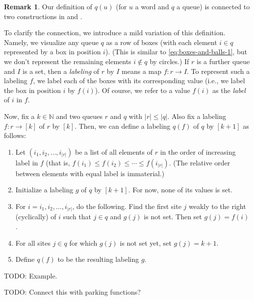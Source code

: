 \documentclass[reqno]{amsart}
\newcommand{\0}{\phantom{c}}
\newcommand{\NN}{\mathbb{N}}
\newcommand{\abs}[1]{\left| #1 \right|}
\newcommand{\tup}[1]{\left( #1 \right)}
\newcommand{\ive}[1]{\left[ #1 \right]}
\newcommand{\defn}[1]{{\color{darkred}\emph{#1}}} %
\theoremstyle{plain}
\theoremstyle{definition}
\newtheorem{remark}[thm]{Remark}
\numberwithin{equation}{section}
\begin{document}
\begin{remark} \label{rmk:queue-relations}
Our definition of $q(u)$ (for $u$ a word and $q$ a queue) is connected
to two constructions in \cite{AasLin17} and \cite{AssSea18}.

To clarify the connection, we introduce a mild variation of this definition. %
Namely, we visualize any queue $q$ as a row of boxes (with each element $i \in q$ represented by a box in position $i$).
(This is similar to \eqref{eq:boxes-and-balls-1}, but we don't represent the remaining elements $i \notin q$ by circles.)
If $r$ is a further queue and $I$ is a set, then a \defn{labeling} of $r$ by $I$ means a map $f : r \to I$.
To represent such a labeling $f$, we label each of the boxes with its corresponding value (i.e., we label the box in position $i$ by $f\tup{i}$).
Of course, we refer to a value $f \tup{i}$ as the \defn{label} of $i$ in $f$.

Now, fix a $k \in \NN$ and two queues $r$ and $q$ with $\abs{r} \leq \abs{q}$. Also fix a labeling $f : r \to \ive{k}$ of $r$ by $\ive{k}$.
Then, we can define a labeling \defn{$q(f)$} of $q$ by $\ive{k+1}$ as follows:
\begin{enumerate}
\item Let $\tup{i_1, i_2, \ldots, i_{\abs{r}}}$ be a list of all elements of $r$ in the order of increasing label in $f$ (that is, $f(i_1) \leq f(i_2) \leq \cdots \leq f(i_{\abs{r}})$.
 (The relative order between elements with equal label is immaterial.)

\item Initialize a labeling $g$ of $q$ by $\ive{k+1}$. For now, none of its values is set.

\item For $i = i_1, i_2, \ldots, i_{\abs{r}}$, do the following.
    Find the first site $j$ weakly to the right (cyclically) of $i$ such that $j \in q$ and $g\tup{j}$ is not set.
    Then set $g\tup{j} = f\tup{i}$.

\item For all sites $j \in q$ for which $g \tup{j}$ is not set yet, set $g \tup{j} = k+1$.

\item Define $q(f)$ to be the resulting labeling $g$.
\end{enumerate}

TODO: Example.

TODO: Connect this with parking functions?


\end{remark}
\end{document}
